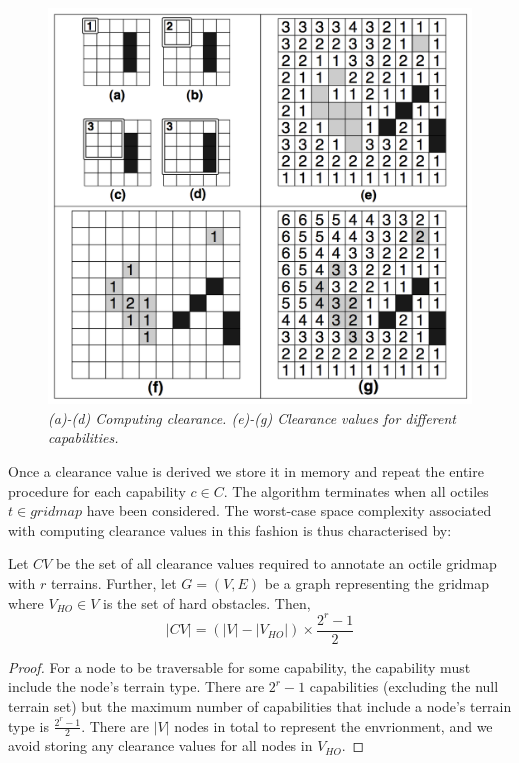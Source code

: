 \begin{figure}[htbp]
	\vspace{-12pt}
       \caption{\emph{(a)-(d) Computing clearance. (e)-(g) Clearance values for different capabilities.}}
       \begin{center}
                       \includegraphics[scale=0.25, trim = 20mm 7mm 20mm 5mm]{diagrams/annotations.png}
       \end{center}
       \label{aha-fig:annotations}
	\vspace{-5pt}
\end{figure}

Once a clearance value is derived we store it in memory and repeat the entire procedure for each capability $c \in C$.  
The algorithm terminates when all octiles $t \in gridmap$ have been considered. 
The worst-case space complexity associated with computing clearance values in this fashion is thus characterised by: 
\begin{lemma}
\label{aha-lemma:numannotations}
Let $CV$ be the set of all clearance values required to annotate an octile gridmap with $r$ terrains. Further, let $G = (V, E)$ be a graph representing the gridmap where $V_{HO} \in V$ is the set of hard obstacles. Then, 
$$|CV| = (|V| - |V_{HO}|)\times \frac{2^{r}-1}{2}$$
\end{lemma}

\begin{proof}
For a node to be traversable for some capability, the capability must include the node's terrain type. 
There are $2^{r}-1$ capabilities (excluding the null terrain set) but the maximum number of capabilities that include a node's terrain type is $\frac{2^{r}-1}{2}$. 
There are $|V|$ nodes in total to represent the envrionment, and we avoid storing any clearance values for all nodes in $V_{HO}$. 
\end{proof}

